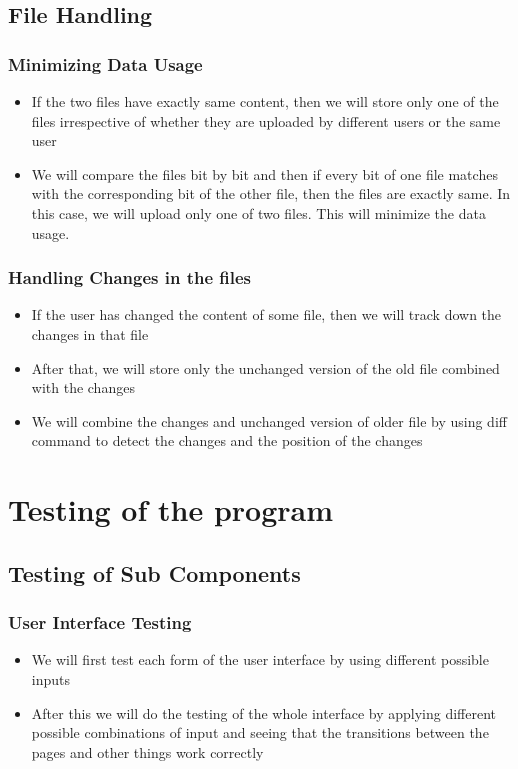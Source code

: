 \documentclass{article}
\begin{document}
		\subsection{File Handling}
			\subsubsection{Minimizing Data Usage}
				\begin{itemize}
					\item If the two files have exactly same content, then we will store only one of the files irrespective of whether they are uploaded by different users or the same user
					\item We will compare the files bit by bit and then if every bit of one file matches with the corresponding bit of the other file, then the files are exactly same. In this case, we will upload only one of two files. This will minimize the data usage.
				\end{itemize}
			\subsubsection{Handling Changes in the files}
				\begin{itemize}
					\item If the user has changed the content of some file, then we will track down the changes in that file
					\item After that, we will store only the unchanged version of the old file combined with the changes 
					\item We will combine the changes and unchanged version of older file by using diff command to detect the changes and the position of the changes
				\end{itemize}
	\section{Testing of the program}
		\subsection{Testing of Sub Components}
			\subsubsection{User Interface Testing}
				\begin{itemize}
					\item We will first test each form of the user interface by using different possible inputs
					\item After this we will do the testing of the whole interface by applying different possible combinations of input and seeing that the transitions between the pages and other things work correctly
				\end{itemize}
\end{document}
